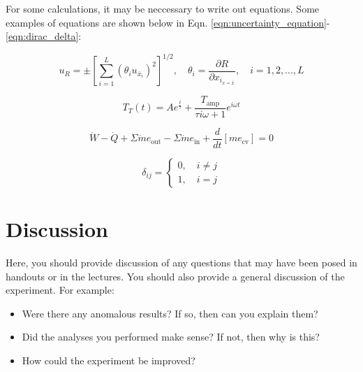 \documentclass[12pt,letterpaper]{article}       %
\begin{document}
For some calculations, it may be neccessary to write out equations.  
Some examples of equations are shown below in Eqn. \ref{eqn:uncertainty_equation}-\ref{eqn:dirac_delta}:

\begin{equation}
	u_R 
	=
	\pm
	\left[
		\sum_{i=1}^{L}
		\left( \theta_i u_{\bar{x}_i} \right)^2
	\right]^{1/2}
	,
	\quad
	\theta_i
	=
	\frac{\partial R}{\partial x_{i_{x=\bar{x}}} },
	\quad
	i=1,2,...,L
	\label{eqn:uncertainty_equation}
\end{equation}

\begin{equation}
	T_T (t)
	=
	A e^{\frac{t}{\tau}}
	+
	\frac{T_{\text{amp}}}{\tau i \omega + 1}
	e^{i\omega t}
\end{equation}

\begin{equation}
	\dot{W}
	-
	\dot{Q}
	+
	\Sigma
	\dot{m} e_{\text{out}}
	-
	\Sigma
	\dot{m} e_{\text{in}}
	+
	\frac{d}{dt}
	\left[ m e_{\text{cv}} \right]
	=
	0
	\label{eqn:energy_equation}
\end{equation}

\begin{equation}
	\delta_{ij}
	=
	\begin{cases}
		0, \quad i \ne j \\ 
		1, \quad i=j
	\end{cases}
	\label{eqn:dirac_delta}
\end{equation}

\section{Discussion}

Here, you should provide discussion of any questions that may have been posed in handouts or in the lectures. You should also provide a general discussion of the experiment. For example:

\begin{itemize}
	\item Were there any anomalous results? If so, then can you explain them?
	\item Did the analyses you performed make sense? If not, then why is this? 
	\item How could the experiment be improved?
\end{itemize}
\end{document}
